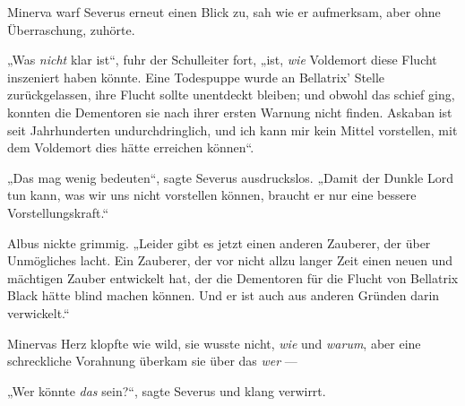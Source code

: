Minerva warf Severus erneut einen Blick zu, sah wie er aufmerksam, aber ohne Überraschung, zuhörte.

„Was \emph{nicht} klar ist“, fuhr der Schulleiter fort, „ist, \emph{wie} Voldemort diese Flucht inszeniert haben könnte. Eine Todespuppe wurde an Bellatrix’ Stelle zurückgelassen, ihre Flucht sollte unentdeckt bleiben; und obwohl das schief ging, konnten die Dementoren sie nach ihrer ersten Warnung nicht finden. Askaban ist seit Jahrhunderten undurchdringlich, und ich kann mir kein Mittel vorstellen, mit dem Voldemort dies hätte erreichen können“.

„Das mag wenig bedeuten“, sagte Severus ausdruckslos.
„Damit der Dunkle Lord tun kann, was wir uns nicht vorstellen können, braucht er nur eine bessere Vorstellungskraft.“

Albus nickte grimmig.
„Leider gibt es jetzt einen anderen Zauberer, der über Unmögliches lacht. Ein Zauberer, der vor nicht allzu langer Zeit einen neuen und mächtigen Zauber entwickelt hat, der die Dementoren für die Flucht von Bellatrix Black hätte blind machen können. Und er ist auch aus anderen Gründen darin verwickelt.“

Minervas Herz klopfte wie wild, sie wusste nicht, \emph{wie} und \emph{warum}, aber eine schreckliche Vorahnung überkam sie über das \emph{wer} —

„Wer könnte \emph{das} sein?“, sagte Severus und klang verwirrt.

